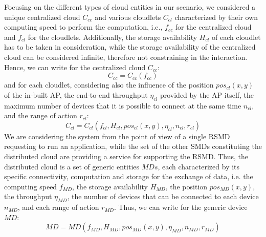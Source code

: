 \documentclass[twoside,openright]{report}
\begin{document}
Focusing on the different types of cloud entities in our scenario, we considered a unique centralized cloud $C_{\textit{cc}}$ and various cloudlets $C_{\textit{cl}}$ characterized by their own computing speed to perform the computation, i.e., $f_\textit{cc}$  for the centralized cloud and  $f_\textit{cl}$  for the cloudlets. Additionally, the storage availability  $H_\textit{cl}$ of each cloudlet has to be taken in consideration, while the storage availability of the centralized cloud can be considered infinite, therefore not constraining in the interaction. Hence, we can write for the centralized cloud $C_{\textit{cc}}$:
\begin{equation}
\label{eq:Ccc}
C_{\textit{cc}} = C_{\textit{cc}}(f_{\textit{cc}})
\end{equation} 
and for each cloudlet, considering also the influence of the position $pos_\textit{cl}(x, y)$ of the in-built \gls{AP}, the end-to-end throughput $\eta_{\textit{cl}}$ provided by the \gls{AP} itself, the maximum number of devices that it is possible to connect at the same time $n_\textit{cl}$, and the range of action $ r_{\textit{cl}}$: 
\begin{equation}
\label{eq:Ccl}
C_{\textit{cl}} = C_{\textit{cl}}(f_{\textit{cl}}, H_{\textit{cl}},  pos_{\textit{cl}}(x, y), \eta_{\textit{cl}}, n_\textit{cl}, r_{\textit{cl}})
\end{equation} 
We are considering the system from the point of view 
of a single \gls{RSMD} requesting to run an application, while the set of the other \glspl{SMD} constituting the distributed cloud are providing a service for supporting the  \gls{RSMD}.  
Thus, the distributed cloud is a set of generic entities $\textit{MD}s$, each characterized by its specific connectivity, computation and storage for the exchange of data, i.e. the computing speed $f_{\textit{MD}}$, the storage availability $H_{\textit{MD}}$, the position $pos_{\textit{MD}}(x, y)$, the throughput $\eta_{\textit{MD}}$, the number of devices that can be connected to each device$n_{\textit{MD}}$,  and each range of action $r_{\textit{MD}}$. 
Thus, we can write for the generic device $\textit{MD}$:
\begin{equation}  
\label{eq:SMD}
\textit{MD} = \textit{MD}( f_{\textit{MD}}, H_{\textit{MD}}, pos_{\textit{MD}}(x, y), \eta_{\textit{MD}} ,  n_{\textit{MD}},  r_{\textit{MD}} )
\end{equation}
    
\end{document}
